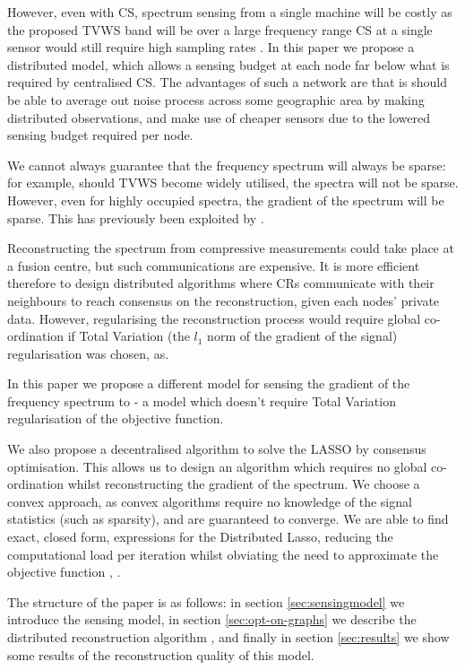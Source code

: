 However, even with CS, spectrum sensing from a single machine will be costly as the proposed TVWS band will be over a large frequency range CS at a single sensor would still require high sampling rates \cite{Zhang2011b}. In this paper we propose a distributed model, which allows a sensing budget at each node far below what is required by centralised CS. The advantages of such a network are that is should be able to average out noise process across some geographic area by making distributed observations, and make use of cheaper sensors due to the lowered sensing budget required per node. 

We cannot always guarantee that the frequency spectrum will always be sparse: for example, should TVWS become widely utilised, the spectra will not be sparse. However, even for highly occupied spectra, the gradient of the spectrum will be sparse. This has previously been exploited by \cite{tian2006wavelet}. 

Reconstructing the spectrum from compressive measurements could take place at a fusion centre, but such communications are expensive. It is more efficient therefore to design distributed algorithms where CRs communicate with their neighbours to reach consensus on the reconstruction, given each nodes' private data. However, regularising the reconstruction process would require global co-ordination if Total Variation (the \(l_1\) norm of the gradient of the signal) regularisation was chosen, as.

In this paper we propose a different model for sensing the gradient of the frequency spectrum to \cite{tian2006wavelet} - a model which doesn't require Total Variation regularisation of the objective function. 

We also propose a decentralised algorithm to solve the LASSO by consensus optimisation. This allows us to design an algorithm which requires no global co-ordination whilst reconstructing the gradient of the spectrum. We choose a convex approach, as convex algorithms require no knowledge of the signal statistics (such as sparsity), and are guaranteed to converge. We are able to find exact, closed form, expressions for the Distributed Lasso, reducing the computational load per iteration whilst obviating the need to approximate the objective function \cite{ling2015dlm}, \cite{mokhtari2015dqm}.

The structure of the paper is as follows: in section \ref{sec:sensingmodel} we introduce the sensing model, in section \ref{sec:opt-on-graphs} we describe the distributed reconstruction algorithm \cite{mota2013d}, and finally in section \ref{sec:results} we show some results of the reconstruction quality of this model. 

